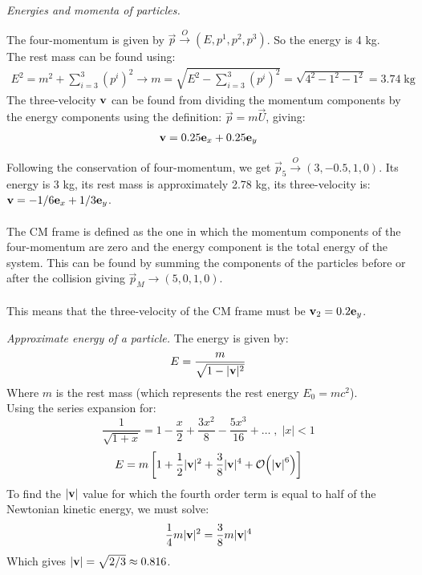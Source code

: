 \documentclass{report}
\begin{document}
\begin{subquests}
	\item \emph{Energies and momenta of particles.}
	\begin{subquests}
		\item
		The four-momentum is given by $\vec p \stackrel{O} \longrightarrow (E, p^1, p^2, p^3)$. So the energy is 4 kg. \\
		The rest mass can be found using:
		\begin{gather*}
			E^2 = m^2 + \sum^3_{i=3} (p^i)^2 \longrightarrow m = \sqrt{E^2 - \sum^3_{i=3}(p^i)^2} = \sqrt{4^2 - 1^2 - 1^2} = 3.74 \;\mathrm{kg} 
		\end{gather*}
		The three-velocity $\vb v$ can be found from dividing the momentum components by the energy components using the definition: $\vec p = m\vec U$, giving:
		\begin{gather*}
			{\vb v} = 0.25\vb{e}_x + 0.25\vb{e}_y
		\end{gather*}
		
		\item		
		Following the conservation of four-momentum, we get $\vec p_5 \stackrel{O}\rightarrow (3, -0.5, 1, 0)$. Its energy is 3 kg, its rest mass is approximately 2.78 kg, its three-velocity is: $\vb v = -1/6\vb{e}_x + 1/3\vb{e}_y$.\\\\
		The CM frame is defined as the one in which the momentum components of the four-momentum are zero and the energy component is the total energy of the system. This can be found by summing the components of the particles before or after the collision giving $\vec p_M \rightarrow (5, 0, 1, 0)$.\\\\
		This means that the three-velocity of the CM frame must be $\vb v_2 = 0.2\vb{e}_y$.
	\end{subquests}

	\item \emph{Approximate energy of a particle.}
	The energy is given by:
	\begin{gather*}
		E = \frac{m}{\sqrt{1-|{\vb v}|^2}}
	\end{gather*}
	Where $m$ is the rest mass (which represents the rest energy $E_0 = mc^2$). \\
	Using the series expansion for: $$\frac{1}{\sqrt{1 + x}} = 1-\frac{x}{2} + \frac{3x^2}{8} - \frac{5x^3}{16} + \dots \;,\; |x| < 1 $$
	\begin{gather*}
		E = m\left[1 + \frac{1}{2}|{\vb v}|^2 + \frac{3}{8}|{\vb v}|^4 + \order{\abs{\vb v}^6} \right]
	\end{gather*}
	To find the $|\vb v|$ value for which the fourth order term is equal to half of the Newtonian kinetic energy, we must solve:
	\begin{gather*}
		\frac{1}{4}m|{\vb v}|^2 = \frac{3}{8}m|{\vb v}|^4
	\end{gather*}
	Which gives $|{\vb v}| = \sqrt{2/3} \approx 0.816$.


\end{subquests}
\end{document}
